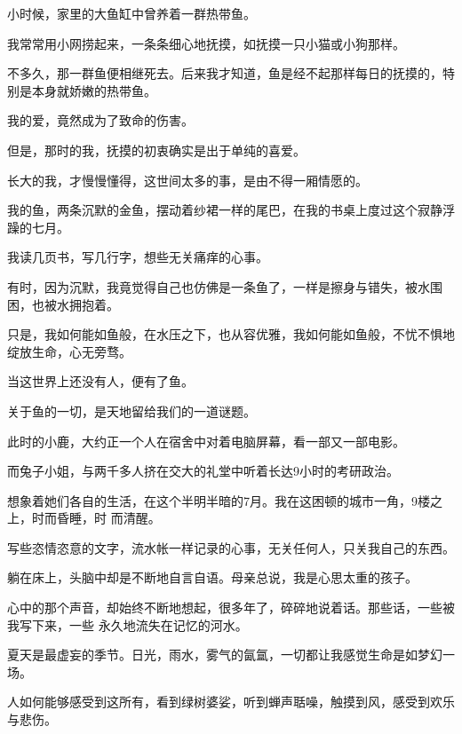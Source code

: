 		\vspace{1em}
		小时候，家里的大鱼缸中曾养着一群热带鱼。\par
		我常常用小网捞起来，一条条细心地抚摸，如抚摸一只小猫或小狗那样。\par
		不多久，那一群鱼便相继死去。后来我才知道，鱼是经不起那样每日的抚摸的，特别是本身就娇嫩的热带鱼。

		\vspace{1em}
		我的爱，竟然成为了致命的伤害。\par
		但是，那时的我，抚摸的初衷确实是出于单纯的喜爱。\par
		长大的我，才慢慢懂得，这世间太多的事，是由不得一厢情愿的。

		\vspace{1em}
		我的鱼，两条沉默的金鱼，摆动着纱裙一样的尾巴，在我的书桌上度过这个寂静浮躁的七月。\par
		我读几页书，写几行字，想些无关痛痒的心事。\par
		有时，因为沉默，我竟觉得自己也仿佛是一条鱼了，一样是擦身与错失，被水围困，也被水拥抱着。\par
		只是，我如何能如鱼般，在水压之下，也从容优雅，我如何能如鱼般，不忧不惧地绽放生命，心无旁骛。

		\vspace{1em}
		当这世界上还没有人，便有了鱼。\par
		关于鱼的一切，是天地留给我们的一道谜题。

	\endwriting



		此时的小鹿，大约正一个人在宿舍中对着电脑屏幕，看一部又一部电影。

		而兔子小姐，与两千多人挤在交大的礼堂中听着长达9小时的考研政治。

		想象着她们各自的生活，在这个半明半暗的7月。我在这困顿的城市一角，9楼之上，时而昏睡，时
	而清醒。

		写些恣情恣意的文字，流水帐一样记录的心事，无关任何人，只关我自己的东西。

		躺在床上，头脑中却是不断地自言自语。母亲总说，我是心思太重的孩子。

		心中的那个声音，却始终不断地想起，很多年了，碎碎地说着话。那些话，一些被我写下来，一些
	永久地流失在记忆的河水。

		夏天是最虚妄的季节。日光，雨水，雾气的氤氲，一切都让我感觉生命是如梦幻一场。

		人如何能够感受到这所有，看到绿树婆娑，听到蝉声聒噪，触摸到风，感受到欢乐与悲伤。

